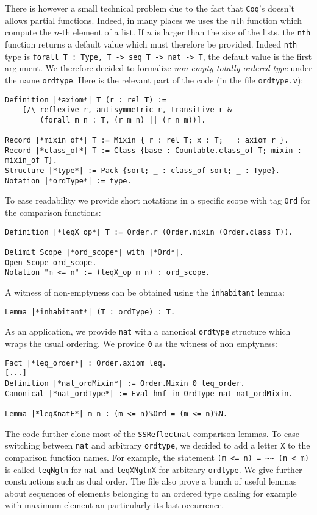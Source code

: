 \documentclass[12pt,a4paper]{article}
\newcommand{\Coq}{\texttt{Coq}\xspace}
\newcommand{\SSR}{\texttt{SSReflect}\xspace}
\begin{document}
There is however a small technical problem due to the fact that \Coq's doesn't
allows partial functions. Indeed, in many places we uses the \lstinline|nth|
function which compute the $n$-th element of a list. If $n$ is larger than the
size of the lists, the \lstinline|nth| function returns a default value which
must therefore be provided. Indeed \lstinline|nth| type is
\lstinline|forall T : Type, T -> seq T -> nat -> T|,
the default value is the first argument. We therefore decided to formalize
\emph{non empty totally ordered type} under the name \lstinline|ordtype|. Here
is the relevant part of the code (in the file \verb|ordtype.v|):
\begin{lstlisting}
Definition |*axiom*| T (r : rel T) :=
    [/\ reflexive r, antisymmetric r, transitive r &
        (forall m n : T, (r m n) || (r n m))].

Record |*mixin_of*| T := Mixin { r : rel T; x : T; _ : axiom r }.
Record |*class_of*| T := Class {base : Countable.class_of T; mixin : mixin_of T}.
Structure |*type*| := Pack {sort; _ : class_of sort; _ : Type}.
Notation |*ordType*| := type.
\end{lstlisting}
To ease readability we provide short notations in a specific scope with tag
\lstinline|Ord| for the comparison functions:
\begin{lstlisting}
Definition |*leqX_op*| T := Order.r (Order.mixin (Order.class T)).

Delimit Scope |*ord_scope*| with |*Ord*|.
Open Scope ord_scope.
Notation "m <= n" := (leqX_op m n) : ord_scope.
\end{lstlisting}
A witness of non-emptyness can be obtained using the \lstinline+inhabitant+ lemma:
\begin{lstlisting}
Lemma |*inhabitant*| (T : ordType) : T.
\end{lstlisting}
As an application, we provide \lstinline|nat| with a canonical \lstinline|ordtype|
structure which wraps the usual ordering. We provide \lstinline|0| as the witness
of non emptyness:
\begin{lstlisting}
Fact |*leq_order*| : Order.axiom leq.
[...]
Definition |*nat_ordMixin*| := Order.Mixin 0 leq_order.
Canonical |*nat_ordType*| := Eval hnf in OrdType nat nat_ordMixin.

Lemma |*leqXnatE*| m n : (m <= n)%Ord = (m <= n)%N.
\end{lstlisting}
The code further clone most of the \SSR \lstinline|nat| comparison lemmas. To
ease switching between \lstinline|nat| and arbitrary \lstinline|ordtype|, we
decided to add a letter \lstinline|X| to the comparison function names. For
example, the statement \lstinline|(m <= n) = ~~ (n < m)| is called
\lstinline|leqNgtn| for \lstinline|nat| and \lstinline|leqXNgtnX| for
arbitrary \lstinline|ordtype|. We give further constructions such as dual
order. The file also prove a bunch of useful lemmas about sequences of elements
belonging to an ordered type dealing for example with maximum element an
particularly its last occurrence.
\end{document}
